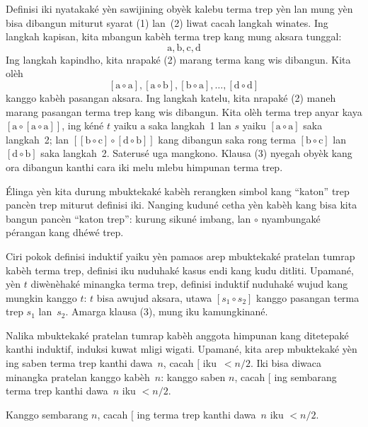\documentclass[../../../include/open-logic-section]{subfiles}
\begin{document}
Definisi iki nyatakaké yèn sawijining
obyèk kalebu terma trep yèn lan mung
yèn bisa dibangun miturut syarat
(1) lan~(2) liwat cacah langkah winates.
Ing langkah kapisan, kita mbangun
kabèh terma trep kang mung aksara
tunggal:
\[
\mathrm{a}, \mathrm{b}, \mathrm{c}, \mathrm{d}
\]
Ing langkah kapindho, kita nrapaké
(2) marang terma kang wis dibangun.
Kita olèh
\[
[\mathrm{a} \circ \mathrm{a}], [\mathrm{a} \circ \mathrm{b}],
[\mathrm{b} \circ \mathrm{a}], \dots, [\mathrm{d} \circ \mathrm{d}]
\]
kanggo kabèh pasangan aksara.
Ing langkah katelu, kita nrapaké
(2) maneh marang pasangan terma
trep kang wis dibangun. Kita
olèh terma trep anyar kaya
$[\mathrm{a} \circ [\mathrm{a} \circ
    \mathrm{a}]]$, ing kéné
$t$ yaiku $\mathrm{a}$ saka
langkah~1 lan $s$ yaiku
$[\mathrm{a} \circ \mathrm{a}]$
saka langkah~2; lan
$[[\mathrm{b} \circ
    \mathrm{c}] \circ [\mathrm{d} \circ \mathrm{b}]]$
kang dibangun saka rong terma
$[\mathrm{b} \circ \mathrm{c}]$
lan $[\mathrm{d}
  \circ \mathrm{b}]$ saka langkah~2.
Saterusé uga mangkono.
Klausa (3) nyegah obyèk kang
ora dibangun kanthi cara iki
melu mlebu himpunan terma trep.

Élinga yèn kita durung mbuktekaké
kabèh rerangken simbol kang ``katon''
trep pancèn trep miturut definisi iki.
Nanging kuduné cetha yèn kabèh
kang bisa kita bangun pancèn
``katon trep'': kurung sikuné
imbang, lan $\circ$ nyambungaké
pérangan kang dhéwé trep.

Ciri pokok definisi induktif yaiku
yèn pamaos arep mbuktekaké
pratelan tumrap kabèh terma trep,
definisi iku nuduhaké kasus endi
kang kudu ditliti. Upamané, yèn
$t$ diwènèhaké minangka terma trep,
definisi induktif nuduhaké
wujud kang mungkin kanggo $t$:
$t$ bisa awujud aksara, utawa
$[s_1 \circ s_2]$ kanggo pasangan
terma trep $s_1$ lan~$s_2$.
Amarga klausa (3), mung iku
kamungkinané.

Nalika mbuktekaké pratelan
tumrap kabèh anggota himpunan
kang ditetepaké kanthi induktif,
induksi kuwat mligi wigati.
Upamané, kita arep mbuktekaké
yèn ing saben terma trep kanthi
dawa~$n$, cacah $[$ iku~$< n/2$.
Iki bisa diwaca minangka pratelan
kanggo kabèh~$n$: kanggo saben $n$,
cacah $[$ ing sembarang terma trep
kanthi dawa~$n$ iku $< n/2$.

\begin{prop}
  Kanggo sembarang $n$, cacah $[$
  ing terma trep kanthi dawa~$n$
  iku $< n/2$.
\end{prop}
\end{document}
